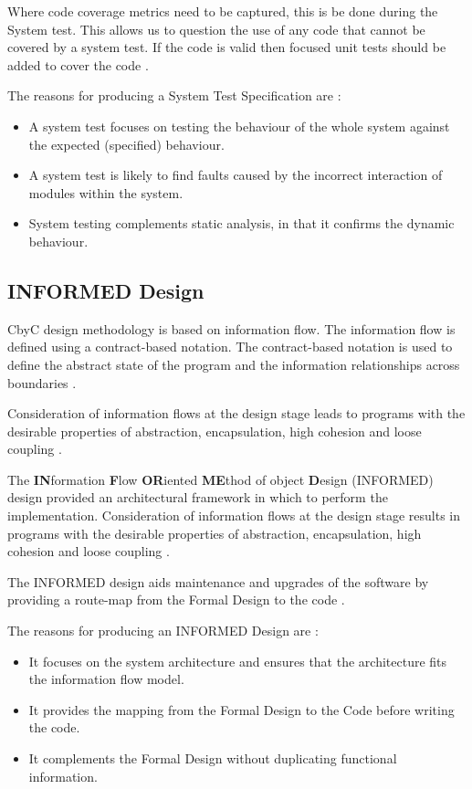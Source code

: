 Where code coverage metrics need to be captured, this is be done during the
System test. This allows us to question the use of any code that cannot be covered
by a system test. If the code is valid then focused unit tests should be added to
cover the code \parencite{Tokeneer}.

The reasons for producing a System Test Specification are \parencite{Tokeneer}:
\begin{itemize}
	\item A system test focuses on testing the behaviour of the whole system against
		the expected (specified) behaviour.
	\item A system test is likely to find faults caused by the incorrect interaction
		of modules within the system.
	\item System testing complements static analysis, in that it confirms the 
		dynamic behaviour.
\end{itemize}

\subsection{INFORMED Design}
CbyC design methodology is based on information flow. The information flow is 
defined using a contract-based notation. The contract-based notation is used to
define the abstract state of the program and the information relationships across
boundaries \parencite{CbyCMan}.

Consideration of information flows at the design stage leads to programs with the
desirable properties of abstraction, encapsulation, high cohesion and loose 
coupling \parencite{Tokeneer}.

The \textbf{IN}formation \textbf{F}low \textbf{OR}iented \textbf{ME}thod of
object \textbf{D}esign (INFORMED) design provided an architectural framework
in which to perform the implementation. Consideration of information flows at the
design stage results in programs with the desirable properties of abstraction, 
encapsulation, high cohesion and loose coupling \parencite{Tokeneer}.

The INFORMED design aids maintenance and upgrades of the software by providing a
route-map from the Formal Design to the code \parencite{Tokeneer}.

The reasons for producing an INFORMED Design are \parencite{Tokeneer}:
\begin{itemize}
	\item It focuses on the system architecture and ensures that the architecture 
		fits the information flow model.
	\item It provides the mapping from the Formal Design to the Code before writing
		the code.
	\item It complements the Formal Design without duplicating functional information.
\end{itemize}

